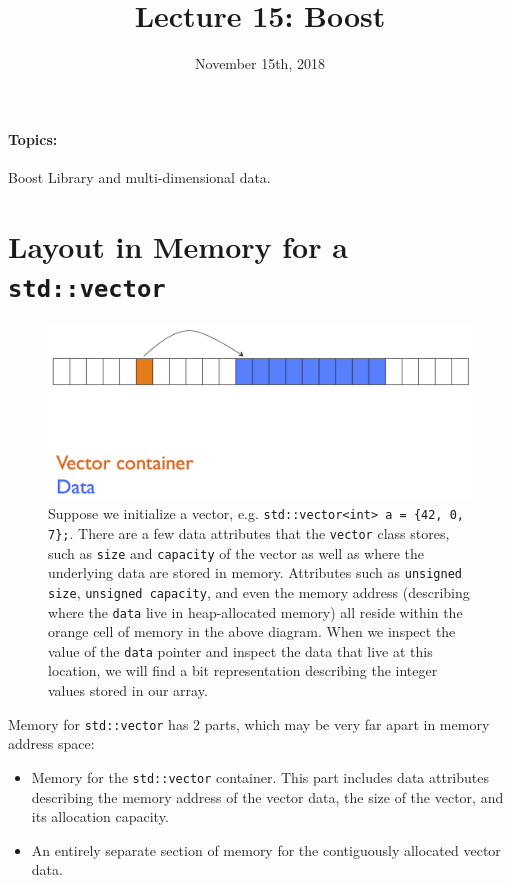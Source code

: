\documentclass[12pt,letterpaper,twoside]{article}
\begin{document}
\title{Lecture 15: Boost\vspace{-5ex}}
\date{November 15th, 2018}
\maketitle

{\footnotesize
\paragraph{Topics:} Boost Library and multi-dimensional data.
}
\vspace{-3ex}

\section{Layout in Memory for a \texttt{std::vector}}

\begin{figure}[h]
\centering
\includegraphics[scale=0.5]{fig/vector-memory.png}
\caption{\footnotesize 
  Suppose we initialize a vector, e.g. \texttt{std::vector<int> a = \{42, 0, 7\};}.
  There are a few data attributes that the \texttt{vector} class stores, such as 
  \texttt{size} and \texttt{capacity} of the vector as well as where the underlying data are stored
  in memory. Attributes such as \texttt{unsigned size}, \texttt{unsigned capacity}, and even the 
  memory address (describing where the \texttt{data} live in heap-allocated memory) 
  all reside within the orange cell of memory in the above diagram. When we inspect the value 
  of the \texttt{data} pointer and inspect the data that live at this location, we will find a bit 
  representation describing the integer values stored in our array.}
\end{figure}

Memory for \texttt{std::vector} has 2 parts, which may be very far apart in memory address space:
\begin{itemize}
\item
  Memory for the \texttt{std::vector} container. This part
  includes data attributes describing the memory address of the vector data, the
  size of the vector, and its allocation capacity.
\item
  An entirely separate section of memory for the contiguously allocated vector data.
\end{itemize}
\end{document}
